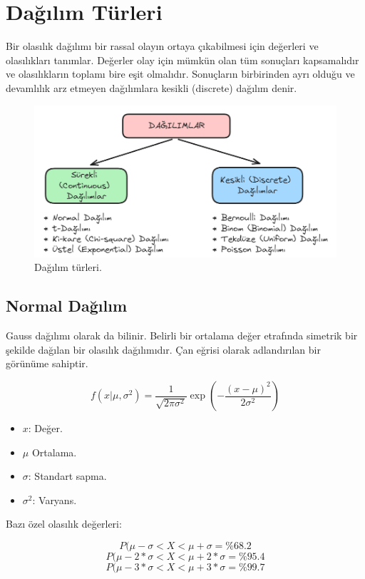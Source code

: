 \section{Dağılım Türleri}
Bir olasılık dağılımı bir rassal olayın ortaya çıkabilmesi için değerleri ve olasılıkları tanımlar. Değerler olay için mümkün olan tüm sonuçları kapsamalıdır ve olasılıkların toplamı bire eşit olmalıdır. Sonuçların birbirinden ayrı olduğu ve devamlılık arz etmeyen dağılımlara kesikli (discrete) dağılım denir. 

\begin{figure}[h]
    \centering
    \includegraphics[width=1\textwidth]{images/types_of_distribution.png}
    \caption{Dağılım türleri.}
    \label{fig:enter-label}
\end{figure}

\subsection{Normal Dağılım}
Gauss dağılımı olarak da bilinir. Belirli bir ortalama değer etrafında simetrik bir şekilde dağılan bir olasılık dağılımıdır. Çan eğrisi olarak adlandırılan bir görünüme sahiptir.

\[f(x | \mu, \sigma^2) = \frac{1}{\sqrt{2\pi\sigma^2}} \exp\left(-\frac{(x-\mu)^2}{2\sigma^2}\right)\]
\begin{itemize}
	\item $x$: Değer.
	\item $\mu$ Ortalama.
	\item $\sigma$: Standart sapma.
	\item $\sigma^2$: Varyans.
\end{itemize}

Bazı özel olasılık değerleri:

\[P(\mu - \sigma < X < \mu + \sigma = \%68.2\]
\[P(\mu - 2 * \sigma < X < \mu + 2 * \sigma  = \%95.4\]
\[P(\mu - 3 * \sigma < X < \mu + 3 * \sigma  = \%99.7\]

